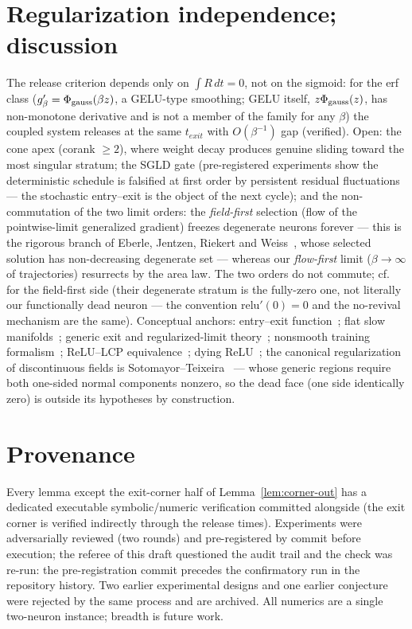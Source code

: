 \documentclass[11pt]{article}
\begin{document}
\section{Regularization independence; discussion}\label{sec:reg}
The release criterion depends only on $\int R\,dt=0$, not on the sigmoid: for
the erf class ($g_\beta'=\Phi_{\rm gauss}(\beta z)$, a GELU-type smoothing;
GELU itself, $z\Phi_{\rm gauss}(z)$, has non-monotone derivative and is not a
member of the family for any $\beta$) the coupled system releases at the same $t_{exit}$ with
$O(\beta^{-1})$ gap (verified). Open: the cone apex (corank $\ge2$), where
weight decay produces genuine sliding toward the most singular stratum; the
SGLD gate (pre-registered experiments show the deterministic schedule is
falsified at first order by persistent residual fluctuations --- the stochastic
entry--exit is the object of the next cycle); and the non-commutation of the two limit orders: the \emph{field-first}
selection (flow of the pointwise-limit generalized gradient) freezes degenerate
neurons forever --- this is the rigorous branch of Eberle, Jentzen, Riekert and
Weiss~\cite{EJRW23}, whose selected solution has non-decreasing degenerate set
--- whereas our \emph{flow-first} limit ($\beta\to\infty$ of trajectories)
resurrects by the area law. The two orders do not commute; cf.~\cite{EJRW23}
for the field-first side (their degenerate stratum is the fully-zero one, not
literally our functionally dead neuron --- the convention $\mathrm{relu}'(0)=0$
and the no-revival mechanism are the same). Conceptual anchors: entry--exit
function~\cite{DMS16,SDR23}; flat slow manifolds~\cite{Kri17}; generic exit
and regularized-limit theory~\cite{Jef16,GH}; nonsmooth training
formalism~\cite{BP21}; ReLU--LCP equivalence~\cite{APM20}; dying
ReLU~\cite{Lu19}; the canonical regularization of discontinuous fields is
Sotomayor--Teixeira~\cite{ST98,LST07} --- whose generic regions require both
one-sided normal components nonzero, so the dead face (one side identically
zero) is outside its hypotheses by construction.

\section*{Provenance}
Every lemma except the exit-corner half of Lemma~\ref{lem:corner-out} has a
dedicated executable symbolic/numeric verification committed alongside (the
exit corner is verified indirectly through the release times). Experiments were
adversarially reviewed (two rounds) and pre-registered by commit before
execution; the referee of this draft questioned the audit trail and the check
was re-run: the pre-registration commit precedes the confirmatory run in the
repository history. Two earlier experimental designs and one earlier conjecture
were rejected by the same process and are archived. All numerics are a single
two-neuron instance; breadth is future work.
\end{document}
